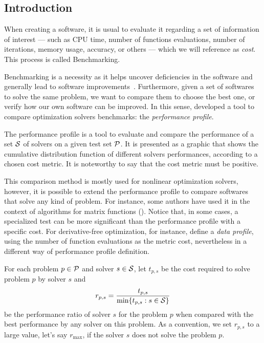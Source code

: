 \subsection*{Introduction}

    When creating a software, it is usual to evaluate it regarding a set of
    information of interest
    --- such as CPU time, number of
    functions evaluations, number of iterations, memory usage, accuracy, or
    others --- which we will
    reference as \emph{cost}. This process is called Benchmarking.

    Benchmarking is a necessity as it
    helps uncover deficiencies in the software and generally lead
    to software
    improvements~\cite{url:mittelmann,Mittelmann:1999fb,Dolan:2006kl}.
    Furthermore, given a set of softwares to solve the same problem, we want to
    compare them to choose the best one, or verify how our own software can be
    improved.
    In this sense, \textcite{Dolan:2002du} developed a tool to compare
    optimization solvers benchmarks: the \emph{performance profile}.

    The performance profile is a tool to evaluate and compare the performance
    of a set $\mathcal{S}$ of solvers  on a given test set $\mathcal{P}$. It is presented as
    a graphic that shows the cumulative distribution function of different 
    solvers performances, according to a chosen cost metric.
    It is noteworthy to say that the cost metric must be positive.

    This comparison method is mostly used for nonlinear optimization solvers,
    however, it is possible to extend the performance profile to compare
    softwares that solve any kind of problem.
    For instance, some authors have used it in the context of algorithms for
    matrix functions (\cite{al-mohy:2009, al-mohy:2011, al-mohy:2012,
    higham:2005, higham:2009, higham:2011, higham:2013}).
    Notice that, in some cases, a
    specialized test can be more significant than the performance profile with
    a specific cost.  For derivative-free optimization, for instance,
    \textcite{More:2009benchmarking} define a \emph{data profile}, using the
    number of function evaluations as the metric cost, nevertheless in a 
    different way of performance profile definition.

    For each
    problem $p \in \mathcal{P}$ and solver $s \in \mathcal{S}$, let $t_{p,s}$ be the
    cost required to solve problem $p$ by solver $s$ and
    \begin{align*}
      r_{p,s} = \frac{t_{p,s}}{\min\{t_{p,s}: s \in \mathcal{S}\}}
    \end{align*}
    be the performance ratio of solver $s$ for the problem $p$ when compared
    with the best performance by any solver on this problem.
    As a convention, we set $r_{p,s}$ to a large value, let's say $r_{\max}$, if
    the solver $s$ does not solve the problem $p$.

